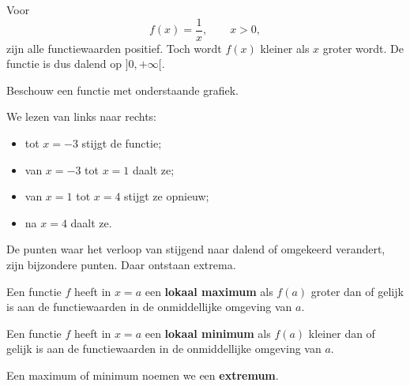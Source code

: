 \documentclass{ximera}
\begin{document}
\begin{voorbeeld}
Voor
\[
f(x)=\frac{1}{x},\qquad x>0,
\]
zijn alle functiewaarden positief. Toch wordt \(f(x)\) kleiner als \(x\) groter wordt.
De functie is dus dalend op \(]0,+\infty[\).
\end{voorbeeld}


Beschouw een functie met onderstaande grafiek.

\begin{center}
\end{center}

We lezen van links naar rechts:
\begin{itemize}
  \item tot \(x=-3\) stijgt de functie;
  \item van \(x=-3\) tot \(x=1\) daalt ze;
  \item van \(x=1\) tot \(x=4\) stijgt ze opnieuw;
  \item na \(x=4\) daalt ze.
\end{itemize}

De punten waar het verloop van stijgend naar dalend of omgekeerd verandert,
zijn bijzondere punten. Daar ontstaan extrema.


\begin{definitie}
Een functie \(f\) heeft in \(x=a\) een \textbf{lokaal maximum}
als \(f(a)\) groter dan of gelijk is aan de functiewaarden in de onmiddellijke
omgeving van \(a\).

Een functie \(f\) heeft in \(x=a\) een \textbf{lokaal minimum}
als \(f(a)\) kleiner dan of gelijk is aan de functiewaarden in de onmiddellijke
omgeving van \(a\).
\end{definitie}

Een maximum of minimum noemen we een \textbf{extremum}.
\end{document}
